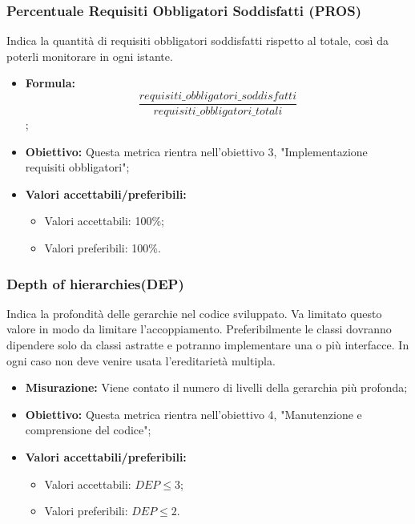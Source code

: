\subsubsection{Percentuale Requisiti Obbligatori Soddisfatti (PROS)}
Indica la quantità di requisiti obbligatori soddisfatti rispetto al totale, così da poterli monitorare in ogni istante.
\begin{itemize}
	\item \textbf{Formula:}\[\frac{requisiti\_obbligatori\_soddisfatti}{requisiti\_obbligatori\_totali}\];
	\item \textbf{Obiettivo:} Questa metrica rientra nell'obiettivo 3, "Implementazione requisiti obbligatori";
	\item \textbf{Valori accettabili/preferibili: }
	\begin{itemize}
		\item Valori accettabili: 100\%;
		\item Valori preferibili: 100\%.
	\end{itemize}
\end{itemize}




\subsubsection{Depth of hierarchies(DEP)}
Indica la profondità delle gerarchie nel codice sviluppato. Va limitato questo valore in modo da limitare l'accoppiamento. Preferibilmente le classi dovranno dipendere solo da classi astratte e potranno implementare una o più interfacce. In ogni caso non deve venire usata l'ereditarietà multipla.
\begin{itemize}
	\item \textbf{Misurazione:} Viene contato il numero di livelli della gerarchia più profonda;
	\item \textbf{Obiettivo:} Questa metrica rientra nell'obiettivo 4, "Manutenzione e comprensione del codice";
	\item \textbf{Valori accettabili/preferibili: }
	\begin{itemize}
		\item Valori accettabili: $DEP \leq 3$;
		\item Valori preferibili: $DEP \leq 2$.
	\end{itemize}
\end{itemize}

